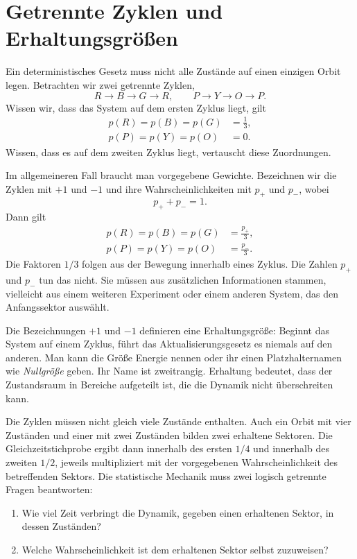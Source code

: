 \section{Getrennte Zyklen und Erhaltungsgrößen}

Ein deterministisches Gesetz muss nicht alle Zustände auf einen einzigen Orbit legen. Betrachten wir zwei getrennte Zyklen,
\begin{equation}
 R\longrightarrow B\longrightarrow G\longrightarrow R,
 \qquad
 P\longrightarrow Y\longrightarrow O\longrightarrow P.
 \label{eq:sm1-two-cycles}
\end{equation}
Wissen wir, dass das System auf dem ersten Zyklus liegt, gilt
\begin{equation}
 \begin{aligned}
 p(R)=p(B)=p(G)&=\frac13,\\
 p(P)=p(Y)=p(O)&=0.
 \end{aligned}
\end{equation}
Wissen, dass es auf dem zweiten Zyklus liegt, vertauscht diese Zuordnungen.

Im allgemeineren Fall braucht man vorgegebene Gewichte. Bezeichnen wir die Zyklen mit \(+1\) und \(-1\) und ihre Wahrscheinlichkeiten mit \(p_+\) und \(p_-\), wobei
\begin{equation}
 p_++p_-=1.
\end{equation}
Dann gilt
\begin{align}
 p(R)=p(B)=p(G)&=\frac{p_+}{3},\\
 p(P)=p(Y)=p(O)&=\frac{p_-}{3}.
 \label{eq:sm1-sector-weights}
\end{align}
Die Faktoren \(1/3\) folgen aus der Bewegung innerhalb eines Zyklus. Die Zahlen \(p_+\) und \(p_-\) tun das nicht. Sie müssen aus zusätzlichen Informationen stammen, vielleicht aus einem weiteren Experiment oder einem anderen System, das den Anfangssektor auswählt.

Die Bezeichnungen \(+1\) und \(-1\) definieren eine Erhaltungsgröße: Beginnt das System auf einem Zyklus, führt das Aktualisierungsgesetz es niemals auf den anderen. Man kann die Größe Energie nennen oder ihr einen Platzhalternamen wie \emph{Nullgröße} geben. Ihr Name ist zweitrangig. Erhaltung bedeutet, dass der Zustandsraum in Bereiche aufgeteilt ist, die die Dynamik nicht überschreiten kann.

Die Zyklen müssen nicht gleich viele Zustände enthalten. Auch ein Orbit mit vier Zuständen und einer mit zwei Zuständen bilden zwei erhaltene Sektoren. Die Gleichzeitstichprobe ergibt dann innerhalb des ersten \(1/4\) und innerhalb des zweiten \(1/2\), jeweils multipliziert mit der vorgegebenen Wahrscheinlichkeit des betreffenden Sektors. Die statistische Mechanik muss zwei logisch getrennte Fragen beantworten:
\begin{enumerate}\item Wie viel Zeit verbringt die Dynamik, gegeben einen erhaltenen Sektor, in dessen Zuständen?
\item Welche Wahrscheinlichkeit ist dem erhaltenen Sektor selbst zuzuweisen?
\end{enumerate}

